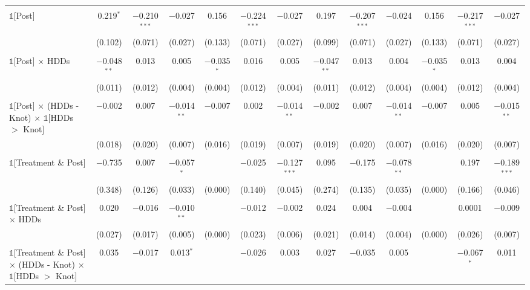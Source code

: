 \begin{table}[!htbp]
\begin{tabular}{@{\extracolsep{20pt}}lcccccccccccc}
  & & & & & & & & & & & & \\ 
 $\mathbb{1}$[Post] & 0.219$^{*}$ & $-$0.210$^{***}$ & $-$0.027 & 0.156 & $-$0.224$^{***}$ & $-$0.027 & 0.197 & $-$0.207$^{***}$ & $-$0.024 & 0.156 & $-$0.217$^{***}$ & $-$0.027 \\ 
  & (0.102) & (0.071) & (0.027) & (0.133) & (0.071) & (0.027) & (0.099) & (0.071) & (0.027) & (0.133) & (0.071) & (0.027) \\ 
  & & & & & & & & & & & & \\ 
 $\mathbb{1}$[Post] $\times$ HDDs & $-$0.048$^{**}$ & 0.013 & 0.005 & $-$0.035$^{*}$ & 0.016 & 0.005 & $-$0.047$^{**}$ & 0.013 & 0.004 & $-$0.035$^{*}$ & 0.013 & 0.004 \\ 
  & (0.011) & (0.012) & (0.004) & (0.004) & (0.012) & (0.004) & (0.011) & (0.012) & (0.004) & (0.004) & (0.012) & (0.004) \\ 
  & & & & & & & & & & & & \\ 
 $\mathbb{1}$[Post] $\times$ (HDDs - Knot) $\times$ $\mathbb{1}$[HDDs $>$ Knot] & $-$0.002 & 0.007 & $-$0.014$^{**}$ & $-$0.007 & 0.002 & $-$0.014$^{**}$ & $-$0.002 & 0.007 & $-$0.014$^{**}$ & $-$0.007 & 0.005 & $-$0.015$^{**}$ \\ 
  & (0.018) & (0.020) & (0.007) & (0.016) & (0.019) & (0.007) & (0.019) & (0.020) & (0.007) & (0.016) & (0.020) & (0.007) \\ 
  & & & & & & & & & & & & \\ 
 $\mathbb{1}$[Treatment \& Post] & $-$0.735 & 0.007 & $-$0.057$^{*}$ &  & $-$0.025 & $-$0.127$^{***}$ & 0.095 & $-$0.175 & $-$0.078$^{**}$ &  & 0.197 & $-$0.189$^{***}$ \\ 
  & (0.348) & (0.126) & (0.033) & (0.000) & (0.140) & (0.045) & (0.274) & (0.135) & (0.035) & (0.000) & (0.166) & (0.046) \\ 
  & & & & & & & & & & & & \\ 
 $\mathbb{1}$[Treatment \& Post] $\times$ HDDs & 0.020 & $-$0.016 & $-$0.010$^{**}$ &  & $-$0.012 & $-$0.002 & 0.024 & 0.004 & $-$0.004 &  & 0.0001 & $-$0.009 \\ 
  & (0.027) & (0.017) & (0.005) & (0.000) & (0.023) & (0.006) & (0.021) & (0.014) & (0.004) & (0.000) & (0.026) & (0.007) \\ 
  & & & & & & & & & & & & \\ 
 $\mathbb{1}$[Treatment \& Post] $\times$ (HDDs - Knot) $\times$ $\mathbb{1}$[HDDs $>$ Knot] & 0.035 & $-$0.017 & 0.013$^{*}$ &  & $-$0.026 & 0.003 & 0.027 & $-$0.035 & 0.005 &  & $-$0.067$^{*}$ & 0.011 \\ 

\end{tabular}
\end{table}

